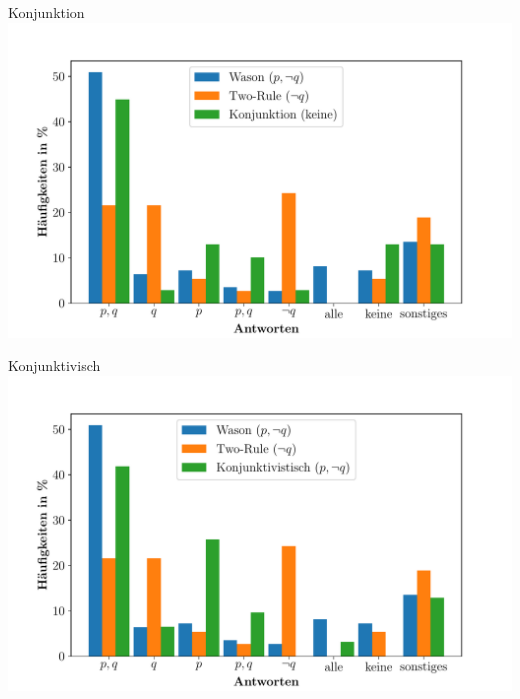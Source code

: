 \begin{frame}{Konjunktion}
    \includegraphics[width=\textwidth]{../plot/results_conjunction.pdf}
\end{frame}


\begin{frame}{Konjunktivisch}
    \includegraphics[width=\textwidth]{../plot/results_subjunctive.pdf}
\end{frame}
